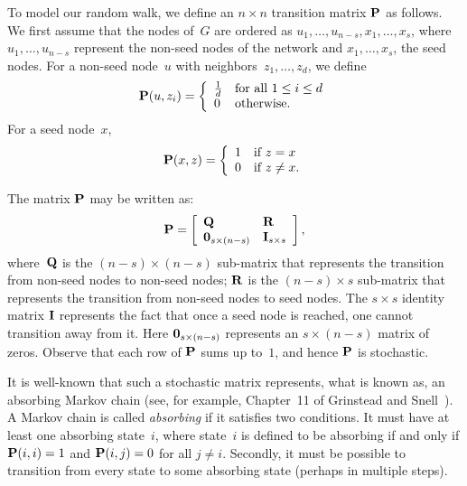 To model our random walk, we define an $n \times n$ transition matrix $\mathbf{P}$ 
as follows. We first assume that the nodes of~$G$ are ordered as 
$u_1, \ldots, u_{n - s}, x_{1}, \ldots, x_{s}$, where $u_1, \ldots, u_{n - s}$
represent the non-seed nodes of the network and $x_1, \ldots, x_s$, the seed nodes.
For a non-seed node~$u$ with neighbors~$z_1, \ldots, z_d$, we define
\begin{equation}\label{eqn:defining_prob_nonseed}
	\mathbf{P}(u, z_i) = \left \{ 
							\begin{array}{ll}
								\frac{1}{d} & \mbox{for all } 1 \leq i \leq d \\
								0			& \mbox{otherwise.}
							\end{array}
						\right.
\end{equation}
For a seed node~$x$, 
\begin{equation}\label{eqn:defining_prob_seed}
	\mathbf{P}(x,z) = 	\left \{ 
						\begin{array}{ll}
							1 & \mbox{if $z = x$} \\
							0 & \mbox{if $z \neq x$.}
						\end{array}
					\right.
\end{equation}

The matrix $\mathbf{P}$ may be written as:
\begin{equation}\label{eqn:canonical_form_P}
	\mathbf{P} = 	\left [ \begin{array}{ll}
						\mathbf{Q}  & \mathbf{R} \\
						 \mathbf{0}_{s \times (n - s)} & \mathbf{I}_{s \times s}
						\end{array}
				\right ],
\end{equation}
where~$\mathbf{Q}$ is the $(n - s) \times (n - s)$ sub-matrix that represents the transition 
from non-seed nodes to non-seed nodes; $\mathbf{R}$ is the $(n - s) \times s$ sub-matrix 
that represents the transition from non-seed nodes to seed nodes. The $s \times s$ identity 
matrix $\mathbf{I}$ represents the fact that once a seed node is reached, one cannot transition away 
from it. Here $\mathbf{0}_{s \times (n - s)}$ represents an $s \times (n - s)$ matrix of zeros. 
Observe that each row of $\mathbf{P}$ sums up to~$1$, and hence $\mathbf{P}$ is stochastic.

It is well-known that such a stochastic matrix represents, what is known as, an 
absorbing Markov chain (see, for example, Chapter~11 of Grinstead and Snell~\cite{GS98}).  
A Markov chain is called \emph{absorbing} if it satisfies two conditions. 
It must have at least one absorbing state~$i$, where state~$i$ is defined to be absorbing if and only if 
$\mathbf{P}(i,i) = 1$ and $\mathbf{P}(i, j) = 0$ for all $j \neq i$. Secondly, it must be possible to transition 
from every state to some absorbing state (perhaps in multiple steps). 

